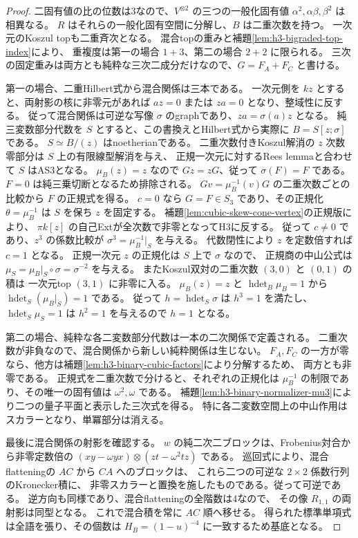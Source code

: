 \begin{proof}
二固有値の比の位数は3なので、$V^{\otimes2}$ の三つの一般化固有値
$\alpha^2,\alpha\beta,\beta^2$ は相異なる。
$R$ はそれらの一般化固有空間に分解し、$B$ は二重次数を持つ。
一次元のKoszul topも二重斉次となる。
混合topの重みと補題\ref{lem:h3-bigraded-top-index}により、
重複度は第一の場合 $1+3$、第二の場合 $2+2$ に限られる。
三次の固定重みは両方とも純粋な三次二成分だけなので、$G=F_A+F_C$ と書ける。

第一の場合、二重Hilbert式から混合関係は三本である。
一次元側を $kz$ とすると、両射影の核に非零元があれば
$a z=0$ または $z a=0$ となり、整域性に反する。
従って混合関係は可逆な写像 $\sigma$ のgraphであり、$za=\sigma(a)z$ となる。
純三変数部分代数を $S$ とすると、この書換えとHilbert式から実際に $B=S[z;\sigma]$ である。
$S\simeq B/(z)$ はnoetherianである。
二重次数付きKoszul解消の $z$ 次数零部分は $S$ 上の有限線型解消を与え、
正規一次元に対するRees lemmaと合わせて $S$ はAS3となる。
$\mu_B(z)=z$ なので $Gz=zG$、従って $\sigma(F)=F$ である。
$F=0$ は純三乗切断となるため排除される。
$Gv=\mu_B^{-1}(v)G$ の二重次数ごとの比較から $F$ の正規式を得る。
$c=0$ なら $G=F\in S_3$ であり、その正規化
$\theta=\mu_B^{-1}$ は $S$ を保ち $z$ を固定する。
補題\ref{lem:cubic-skew-cone-vertex}の正規版により、
$\pi k[z]$ の自己Extが全次数で非零となってH3に反する。
従って $c\ne0$ であり、$z^3$ の係数比較が
$\sigma^3=\mu_B^{-1}|_S$ を与える。
代数閉性により $z$ を定数倍すれば $c=1$ となる。
正規一次元 $z$ の正規化は $S$ 上で $\sigma$ なので、
正規商の中山公式\cite[Lemma 1.5]{RRZ}は
$\mu_S=\mu_B|_S\circ\sigma=\sigma^{-2}$ を与える。
またKoszul双対の二重次数 $(3,0)$ と $(0,1)$ の積は
一次元top $(3,1)$ に非零に入る。
$\mu_B(z)=z$ と $\operatorname{hdet}_B\mu_B=1$ から
$\operatorname{hdet}_S(\mu_B|_S)=1$ である。
従って $h=\operatorname{hdet}_S\sigma$ は $h^3=1$ を満たし、
$\operatorname{hdet}_S\mu_S=1$ は $h^2=1$ を与えるので $h=1$ となる。

第二の場合、純粋な各二変数部分代数は一本の二次関係で定義される。
二重次数が非負なので、混合関係から新しい純粋関係は生じない。
$F_A,F_C$ の一方が零なら、他方は補題\ref{lem:h3-binary-cubic-factors}により分解するため、
両方とも非零である。
正規式を二重次数で分けると、それぞれの正規化は
$\mu_B^{-1}$ の制限であり、その唯一の固有値は $\omega^2,\omega$ である。
補題\ref{lem:h3-binary-normalizer-mu3}により二つの量子平面と表示した三次式を得る。
特に各二変数空間上の中山作用はスカラーとなり、単冪部分は消える。

最後に混合関係の射影を確認する。
$w$ の純二次二ブロックは、Frobenius対合から非零定数倍の
$(xy-\omega yx)\otimes(zt-\omega^2tz)$ である。
巡回式により、混合flatteningの $AC$ から $CA$ へのブロックは、
これら二つの可逆な $2\times2$ 係数行列のKronecker積に、
非零スカラーと置換を施したものである。従って可逆である。
逆方向も同様であり、混合flatteningの全階数は4なので、
その像 $R_{1,1}$ の両射影は同型となる。
これで混合積を常に $AC$ 順へ移せる。
得られた標準単項式は全語を張り、その個数は $H_B=(1-u)^{-4}$ に一致するため基底となる。
\end{proof}
